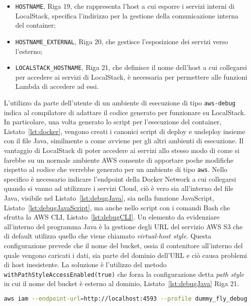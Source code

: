 \begin{itemize}
    \item \verb|HOSTNAME|, Riga 19, che rappresenta l’host a cui esporre i servizi interni di LocalStack, specifica l’indirizzo per la gestione della comunicazione interna del container;
    \item \verb|HOSTNAME_EXTERNAL|, Riga 20, che gestisce l’esposizione dei servizi verso l’esterno;
    \item \verb|LOCALSTACK_HOSTNAME|, Riga 21, che definisce il nome dell’host a cui collegarsi per accedere ai servizi di LocalStack, è necessaria per permettere alle funzioni Lambda di accedere ad essi.
\end{itemize}

L’utilizzo da parte dell’utente di un ambiente di esecuzione di tipo \verb|aws-debug| indica al compilatore di adattare il codice generato per funzionare su LocalStack. In particolare, una volta generato lo script per l’esecuzione del container, Listato~\ref{lst:docker}, vengono creati i canonici script di deploy e undeploy insieme con il file Java, similmente a come avviene per gli altri ambienti di esecuzione. Il vantaggio di LocalStack di poter accedere ai servizi allo stesso modo di come si farebbe su un normale ambiente AWS consente di apportare poche modifiche rispetto al codice che verrebbe generato per un ambiente di tipo \verb|aws|. Nello specifico è necessario indicare l’endpoint della Docker Network a cui collegarsi quando si vanno ad utilizzare i servizi Cloud, ciò è vero sia all’interno del file Java, visibile nel Listato~\ref{lst:debugJava}, sia nella funzione JavaScript, Listato~\ref{lst:debugJavaScript}, ma anche nello script con i comandi Bash che sfrutta la AWS CLI, Listato~\ref{lst:debugCLI}. Un elemento da evidenziare all’interno del programma Java è la gestione degli URL del servizio AWS S3 che di default utilizza quello che viene chiamato \textit{virtual-host style}. Questa configurazione prevede che il nome del bucket, ossia il contenitore all’interno del quale vengono caricati i dati, sia parte del dominio dell’URL e ciò causa problemi di host inesistente. La soluzione è l'utilizzo del metodo \verb|withPathStyleAccessEnabled(true)| che forza la configurazione detta \textit{path style} in cui il nome del bucket è esterno al dominio, Listato~\ref{lst:debugJava} Riga 21. \\

\begin{lstlisting}[language=bash,caption={Utilizzo della AWS CLI sull'ambiente aws-debug}, label={lst:debugCLI}]
aws iam --endpoint-url=http://localhost:4593 --profile dummy_fly_debug put-role-policy --role-name lambda-sqs-execution --policy-name lambda-sqs-policy --policy-document file://policyDocument.json
\end{lstlisting}

